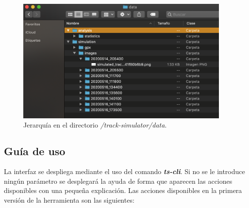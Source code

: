 \begin{figure}[!htb]
\begin{center}
\includegraphics[width=0.95\textwidth]{./Imagenes/dataFolderHierarchy.png}
\caption{Jerarquía en el directorio \textit{\slash track-simulator\slash data}.}
\end{center}
\label{figure:dataFolderHierarchy}
\end{figure}
\newpage

\subsection{Guía de uso}
La interfaz se despliega mediante el uso del comando \textbf{\textit{ts-cli}}. Si no se le 
introduce ningún parámetro se desplegará la ayuda de forma que aparecen las  
acciones disponibles con una pequeña explicación. Las acciones disponibles en la 
primera versión de la herramienta son las siguientes:

